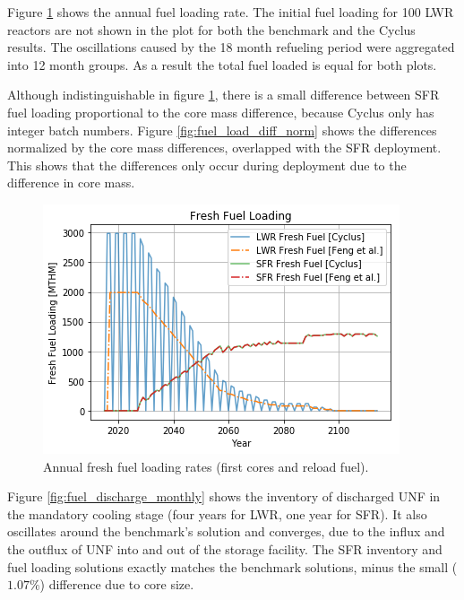 Figure \ref{fig:fuel_load} shows the annual fuel loading rate.
The initial fuel loading for 100 \gls{LWR} reactors are not shown in
the plot for both the benchmark and the Cyclus results.
The oscillations caused by the 18 month refueling period
were aggregated into 12 month groups. As a result the total fuel loaded
is equal for both plots.

Although indistinguishable in figure \ref{fig:fuel_load},
there is a small difference between \gls{SFR} fuel loading proportional
to the core mass difference, because Cyclus only has integer batch numbers.
Figure \ref{fig:fuel_load_diff_norm} shows the
differences normalized by the core mass differences, overlapped with the
\gls{SFR} deployment. This shows that the differences only occur during
deployment due to the difference in core mass.


\begin{figure}[htbp!]
	\begin{center}
		\includegraphics[scale=0.7]{./images/results_18/fuel_load.png}
	\end{center}
	\caption{Annual fresh fuel loading rates (first cores and reload fuel).}
	\label{fig:fuel_load}
\end{figure}

Figure \ref{fig:fuel_discharge_monthly} shows the inventory of discharged
\gls{UNF} in the mandatory cooling stage (four years for \gls{LWR}, one year for \gls{SFR}).
It also oscillates around the benchmark's
solution and converges, due to the influx and the outflux of \gls{UNF}
into and out of the storage facility.
The \gls{SFR} inventory and fuel loading
solutions exactly matches the benchmark solutions, minus the small ($1.07\%$) difference due to core
size.

